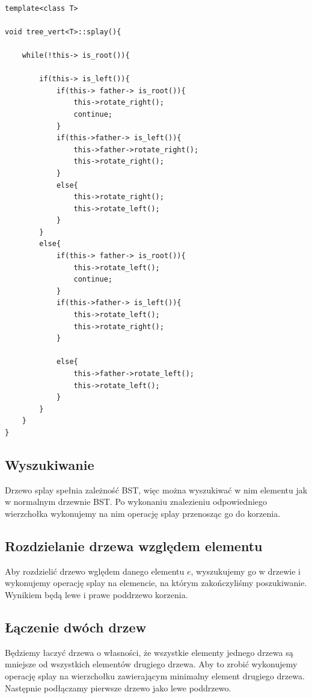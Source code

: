 \documentclass[declaration,shortabstract]{iithesis}
\begin{document}
\begin{lstlisting} 

template<class T> 

void tree_vert<T>::splay(){ 

    while(!this-> is_root()){  

        if(this-> is_left()){ 
            if(this-> father-> is_root()){ 
                this->rotate_right(); 
                continue;  
            } 
            if(this->father-> is_left()){
                this->father->rotate_right(); 
                this->rotate_right(); 
            } 
            else{
                this->rotate_right(); 
                this->rotate_left(); 
            } 
        } 
        else{ 
            if(this-> father-> is_root()){ 
                this->rotate_left();     
                continue;  
            } 
            if(this->father-> is_left()){ 
                this->rotate_left(); 
                this->rotate_right(); 
            } 

            else{
                this->father->rotate_left(); 
                this->rotate_left(); 
            }  
        } 
    } 
} 

\end{lstlisting}  

\subsection{Wyszukiwanie}
Drzewo splay spełnia zależność BST, więc można wyszukiwać w nim elementu jak w normalnym drzewnie BST. Po wykonaniu znalezieniu odpowiedniego wierzchołka wykonujemy na nim operację splay przenosząc go do korzenia. 

\subsection{Rozdzielanie drzewa względem elementu}
Aby rozdzielić drzewo wględem danego elementu \(e\), wyszukujemy go w drzewie i wykonujemy operację splay na elemencie, na którym zakończyliśmy poszukiwanie. Wynikiem będą lewe i prawe poddrzewo korzenia. 

\subsection{Łączenie dwóch drzew}
Będziemy łaczyć drzewa o własności, że wszystkie elementy jednego drzewa są mniejsze od wszystkich elementów drugiego drzewa. Aby to zrobić wykonujemy operację splay na wierzchołku zawierającym minimalny element drugiego drzewa. Następnie podłączamy pierwsze drzewo jako lewe poddrzewo. 
\end{document}

